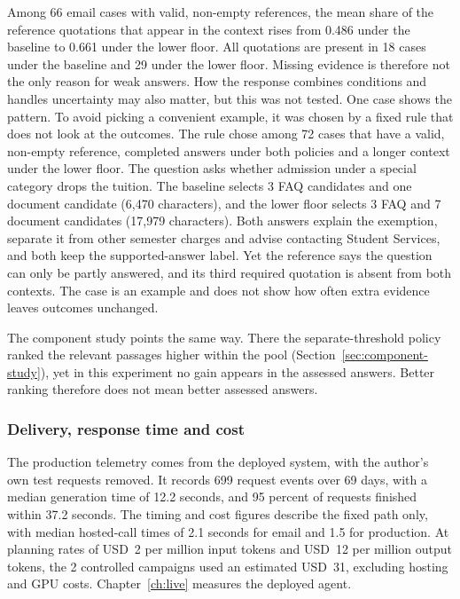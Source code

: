 Among 66 email cases with valid, non-empty references, the mean share of the reference quotations that appear in the context rises from 0.486 under the baseline to 0.661 under the lower floor. All quotations are present in 18 cases under the baseline and 29 under the lower floor. Missing evidence is therefore not the only reason for weak answers. How the response combines conditions and handles uncertainty may also matter, but this was not tested. One case shows the pattern. To avoid picking a convenient example, it was chosen by a fixed rule that does not look at the outcomes. The rule chose among 72 cases that have a valid, non-empty reference, completed answers under both policies and a longer context under the lower floor. The question asks whether admission under a special category drops the tuition. The baseline selects 3 FAQ candidates and one document candidate (6,470 characters), and the lower floor selects 3 FAQ and 7 document candidates (17,979 characters). Both answers explain the exemption, separate it from other semester charges and advise contacting Student Services, and both keep the supported-answer label. Yet the reference says the question can only be partly answered, and its third required quotation is absent from both contexts. The case is an example and does not show how often extra evidence leaves outcomes unchanged.

The component study points the same way. There the separate-threshold policy ranked the relevant passages higher within the pool (Section~\ref{sec:component-study}), yet in this experiment no gain appears in the assessed answers. Better ranking therefore does not mean better assessed answers.

\subsubsection{Delivery, response time and cost}

The production telemetry comes from the deployed system, with the author's own test requests removed. It records 699 request events over 69 days, with a median generation time of 12.2 seconds, and 95 percent of requests finished within 37.2 seconds. The timing and cost figures describe the fixed path only, with median hosted-call times of 2.1 seconds for email and 1.5 for production. At planning rates of USD~2 per million input tokens and USD~12 per million output tokens, the 2 controlled campaigns used an estimated USD~31, excluding hosting and GPU costs. Chapter~\ref{ch:live} measures the deployed agent.


